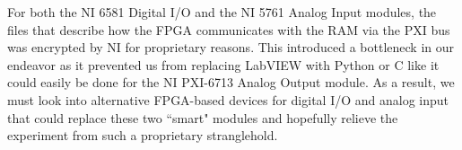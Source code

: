 For both the NI 6581 Digital I/O and the NI 5761 Analog Input modules, the files that describe how the FPGA communicates with the RAM via the PXI bus was encrypted by NI for proprietary reasons. This introduced a bottleneck in our endeavor as it prevented us from replacing LabVIEW with Python or C like it could easily be done for the NI PXI-6713 Analog Output module. As a result, we must look into alternative FPGA-based devices for digital I/O and analog input that could replace these two ``smart" modules and hopefully relieve the experiment from such a proprietary stranglehold.